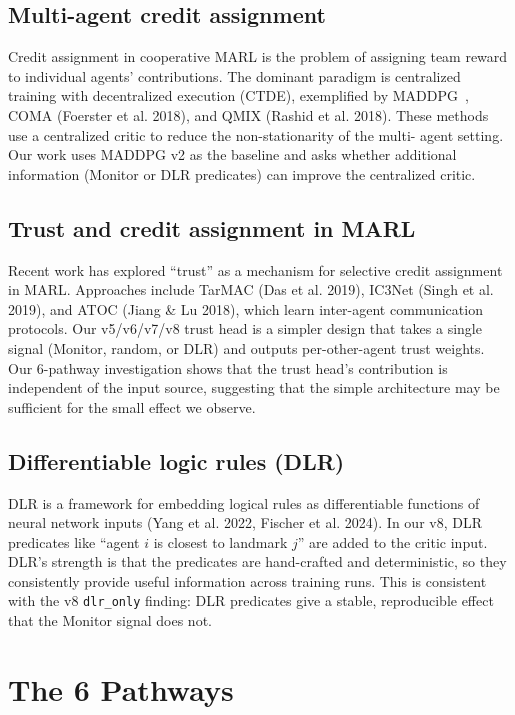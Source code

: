 \documentclass[11pt]{article}
\begin{document}
\subsection{Multi-agent credit assignment}

Credit assignment in cooperative MARL is the problem of assigning
team reward to individual agents' contributions. The dominant
paradigm is centralized training with decentralized execution
(CTDE), exemplified by MADDPG~\cite{lowe2017}, COMA (Foerster et
al. 2018), and QMIX (Rashid et al. 2018). These methods use a
centralized critic to reduce the non-stationarity of the multi-
agent setting. Our work uses MADDPG v2 as the baseline and asks
whether additional information (Monitor or DLR predicates) can
improve the centralized critic.

\subsection{Trust and credit assignment in MARL}

Recent work has explored ``trust'' as a mechanism for selective
credit assignment in MARL. Approaches include TarMAC (Das et al.
2019), IC3Net (Singh et al. 2019), and ATOC (Jiang \& Lu 2018),
which learn inter-agent communication protocols. Our v5/v6/v7/v8
trust head is a simpler design that takes a single signal
(Monitor, random, or DLR) and outputs per-other-agent trust weights.
Our 6-pathway investigation shows that the trust head's
contribution is independent of the input source, suggesting that
the simple architecture may be sufficient for the small effect we
observe.

\subsection{Differentiable logic rules (DLR)}

DLR is a framework for embedding logical rules as differentiable
functions of neural network inputs (Yang et al. 2022, Fischer
et al. 2024). In our v8, DLR predicates like ``agent $i$ is
closest to landmark $j$'' are added to the critic input. DLR's
strength is that the predicates are hand-crafted and deterministic,
so they consistently provide useful information across training
runs. This is consistent with the v8 \texttt{dlr\_only} finding:
DLR predicates give a stable, reproducible effect that the
Monitor signal does not.

\section{The 6 Pathways}
\end{document}

